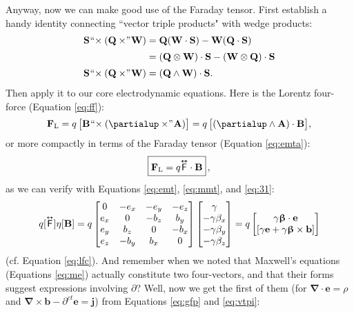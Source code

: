 \documentclass[12pt]{article}
\renewcommand{\vv}[1]{\mathbf{#1}}
\newcommand{\vvbeta}{\bm{\upbeta}}
\newcommand{\del}{\boldsymbol{\nabla}}
\newcommand{\capdy}[1]{ \overset{ \text{\tiny$\bm\leftrightarrow$} }{\vphantom{\text{\small{A}}}\smash{#1}} }
\begin{document}
Anyway, now we can make good use of the Faraday tensor. First establish a handy identity connecting ``vector triple products" with wedge products:
\begin{equation}\label{eq:vtpi}
\begin{split}
\vv S \mkern1mu `` \mkern-4mu \times (\vv Q \times \mkern-4mu " \mkern1mu \vv W) &= \vv Q ( \vv W \cdot \vv S) - \vv W ( \vv Q \cdot \vv S)  \\[2pt]
&= ( \vv Q \otimes \vv W ) \cdot \vv S - ( \vv W \otimes \vv Q ) \cdot \vv S \\[2pt]
\vv S \mkern1mu `` \mkern-4mu \times (\vv Q \times \mkern-4mu " \mkern1mu \vv W) &= ( \vv Q \wedge \vv W ) \cdot \vv S .
\end{split}
\end{equation}
Then apply it to our core electrodynamic equations. Here is the Lorentz four-force (Equation \ref{eq:ff}):
\begin{equation*}
\vv F_{\textrm{L}} = q \, \bigl[ \vv B \mkern1mu `` \mkern-4mu \times (\partialup \times \mkern-4mu " \mkern1mu \vv A) \bigr] = q \, \bigl[ (\partialup \wedge \vv A) \cdot \vv B \bigr] ,
\end{equation*}
or more compactly in terms of the Faraday tensor (Equation \ref{eq:emta}):
\begin{equation}\label{eq:lfffd}
\boxed{ \vphantom{A_{A_A}} \vv F_{\mathrm{L}} = q \capdy{\mathsf{F}} \cdot \vv B } \, ,
\end{equation}
as we can verify with Equations \ref{eq:emt}, \ref{eq:mmt}, and \ref{eq:31}:
\begin{equation*}
q [\capdy{\mathsf{F}}] \eta [\vv B]
=
q
\begin{bmatrix}
0 & -e_x & -e_y & -e_z \\
e_x & 0 & -b_z & b_y \\
e_y & b_z & 0 & -b_x \\
e_z & -b_y & b_x & 0
\end{bmatrix}
\begin{bmatrix}
\gamma \\
- \gamma \beta_x \\
- \gamma \beta_y \\
- \gamma \beta_z
\end{bmatrix}
=
q
\begin{bmatrix}
\gamma \vvbeta \cdot \vv e \\
[ \gamma \vv e + \gamma \vvbeta \times \vv b ]
\end{bmatrix}
\end{equation*}
(cf. Equation \ref{eq:lfc}). And remember when we noted that Maxwell's equations (Equations \ref{eq:me}) actually constitute two four-vectors, and that their forms suggest expressions involving $\partialup$? Well, now we get the first of them (for $\del \cdot \vv e = \rho$ and $ \del \times \vv b - \partial^{ct} \vv e = \vv j$) from Equations \ref{eq:gfp} and \ref{eq:vtpi}:
\end{document}
